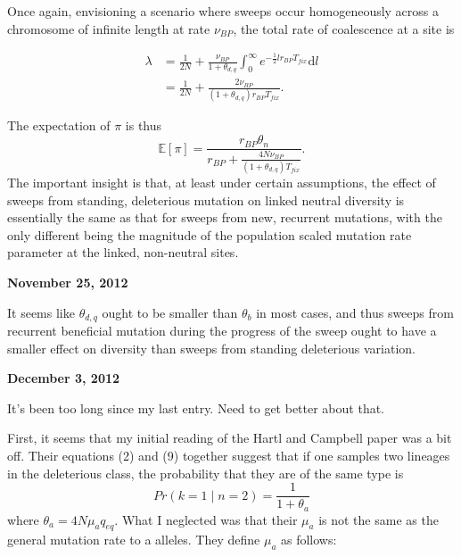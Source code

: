 \documentclass[reqno]{amsart}
\begin{document}
Once again, envisioning a scenario where sweeps occur homogeneously across a chromosome of infinite length at rate $\nu_{BP}$, the total rate of coalescence at a site is

\begin{align}
	\lambda &= \frac{1}{2N}+\frac{\nu_{BP}}{1+\theta_{d,q}}\int_0^\infty e^{-\frac{1}{2}lr_{BP}T_{fix}}\mathrm d l\\
	&= \frac{1}{2N} + \frac{2\nu_{BP}}{\left(1+\theta_{d,q}\right)r_{BP}T_{fix}}.
\end{align}

The expectation of $\pi$ is thus
\begin{equation}
	\mathbb{E}\left[\pi\right] = \frac{r_{BP}\theta_n}{r_{BP} + \frac{4N\nu_{BP}}{\left(1+\theta_{d,q}\right)T_{fix}}}.
\end{equation}
The important insight is that, at least under certain assumptions, the effect of sweeps from standing, deleterious mutation on linked neutral diversity is essentially the same as that for sweeps from new, recurrent mutations, with the only different being the magnitude of the population scaled mutation rate parameter at the linked, non-neutral sites.

\begin{flushright}
	\textbf{November 25, 2012}
\end{flushright}

It seems like $\theta_{d,q}$ ought to be smaller than $\theta_b$ in most cases, and thus sweeps from recurrent beneficial mutation during the progress of the sweep ought to have a smaller effect on diversity than sweeps from standing deleterious variation.

\begin{flushright}
	\textbf{December 3, 2012}
\end{flushright}

It's been too long since my last entry. Need to get better about that.

First, it seems that my initial reading of the Hartl and Campbell paper\cite{Hartl1982} was a bit off. Their equations (2) and (9) together suggest that if one samples two lineages in the deleterious class, the probability that they are of the same type is
\begin{equation}
	Pr(k=1\mid n = 2 ) = \frac{1}{1+\theta_a}
\end{equation}
where $\theta_a = 4N\mu_a q_{eq}$. What I neglected was that their $\mu_a$ is not the same as the general mutation rate to a alleles. They define $\mu_a$ as follows:
\end{document}
